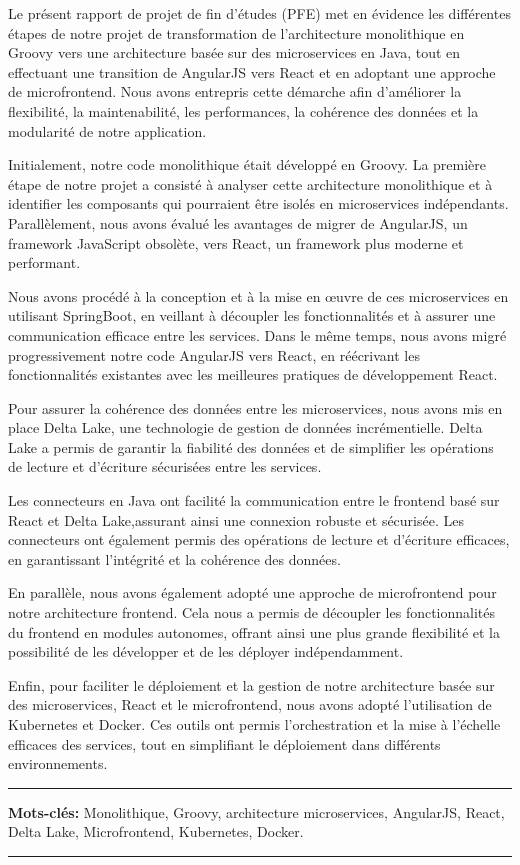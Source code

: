 \resume

Le présent rapport de projet de fin d'études (PFE) met en évidence les différentes étapes de notre projet de transformation de l'architecture monolithique en Groovy vers une architecture basée sur des microservices en Java, tout en effectuant une transition de AngularJS vers React et en adoptant une approche de microfrontend. Nous avons entrepris cette démarche afin d'améliorer la flexibilité, la maintenabilité, les performances, la cohérence des données et la modularité de notre application.
\medskip

Initialement, notre code monolithique était développé en Groovy. La première étape de notre projet a consisté à analyser cette architecture monolithique et à identifier les composants qui pourraient être isolés en microservices indépendants. Parallèlement, nous avons évalué les avantages de migrer de AngularJS, un framework JavaScript obsolète, vers React, un framework plus moderne et performant.

\medskip
Nous avons procédé à la conception et à la mise en œuvre de ces microservices en utilisant SpringBoot, en veillant à découpler les fonctionnalités et à assurer une communication efficace entre les services. Dans le même temps, nous avons migré progressivement notre code AngularJS vers React, en réécrivant les fonctionnalités existantes avec les meilleures pratiques de développement React.
\medskip

Pour assurer la cohérence des données entre les microservices, nous avons mis en place Delta Lake, une technologie de gestion de données incrémentielle. Delta Lake a permis de garantir la fiabilité des données et de simplifier les opérations de lecture et d'écriture sécurisées entre les services.

\medskip
Les connecteurs en Java ont facilité la communication entre le frontend basé sur React et Delta Lake,assurant ainsi une connexion robuste et sécurisée. Les connecteurs ont également permis des opérations de lecture et d'écriture efficaces, en garantissant l'intégrité et la cohérence des données.

\medskip

En parallèle, nous avons également adopté une approche de microfrontend pour notre architecture frontend. Cela nous a permis de découpler les fonctionnalités du frontend en modules autonomes, offrant ainsi une plus grande flexibilité et la possibilité de les développer et de les déployer indépendamment.
\medskip

Enfin, pour faciliter le déploiement et la gestion de notre architecture basée sur des microservices, React et le microfrontend, nous avons adopté l'utilisation de Kubernetes et Docker. Ces outils ont permis l'orchestration et la mise à l'échelle efficaces des services, tout en simplifiant le déploiement dans différents environnements.

\noindent\rule[2pt]{\textwidth}{0.5pt}
{\textbf{Mots-clés:}}
Monolithique, Groovy, architecture microservices, AngularJS, React, Delta Lake, Microfrontend, Kubernetes, Docker.
\\
\noindent\rule[2pt]{\textwidth}{0.5pt}

\clearpage

